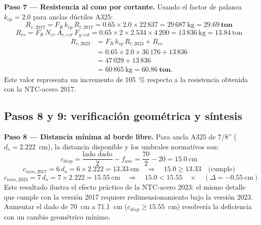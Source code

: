 \textbf{Paso 7 — Resistencia al cono por cortante.}
Usando el factor de palanca $k_{cp}=2.0$ para anclas dúctiles A325:
\begin{equation*}
  R_{v,2017} = F_R\,k_{cp}\,R_{t,2017} = 0.65\times2.0\times22\,837
             = 29\,687~\text{kg} = \mathbf{29.69~\text{ton}}
\end{equation*}
\begin{equation*}
  R_{ev} = F_R\,N_{ev}\,A_{e,est}\,F_{y,est}
         = 0.65\times2\times2.534\times4\,200
         = 13\,836~\text{kg} = 13.84~\text{ton}
\end{equation*}
\begin{align*}
  R_{v,2023}
    &= F_R\,k_{cp}\,R_{t,2023} + R_{ev}\\
    &= 0.65\times2.0\times36\,176 + 13\,836\\
    &= 47\,029 + 13\,836\\
    &= 60\,865~\text{kg}
     = \mathbf{60.86~\text{ton}}.
\end{align*}
Este valor representa un incremento de 105~\% respecto a la resistencia obtenida con la
NTC-acero 2017.

\subsection{Pasos 8 y 9: verificación geométrica y síntesis}

\textbf{Paso 8 — Distancia mínima al borde libre.}
Para ancla A325 de 7/8'' ($d_o = 2.222$~cm), la distancia disponible y los umbrales normativos
son:
\begin{equation*}
  c_{disp} = \frac{\text{lado dado}}{2} - f_{anc}
           = \frac{70}{2} - 20 = 15.0~\text{cm}
\end{equation*}
\begin{equation*}
  c_{min,2017} = 6\,d_o = 6\times2.222 = 13.33~\text{cm} \quad\Rightarrow\quad
  15.0 \geq 13.33 \quad \text{(cumple)}
\end{equation*}
\begin{equation*}
  c_{min,2023} = 7\,d_o = 7\times2.222 = 15.55~\text{cm} \quad\Rightarrow\quad
  15.0 < 15.55 \quad \times\quad (\Delta = {-0.55}~\text{cm})
\end{equation*}
Este resultado ilustra el efecto práctico de la NTC-acero 2023: el mismo detalle que cumple
con la versión 2017 requiere redimensionamiento bajo la versión 2023. Aumentar el dado de
70~cm a 71.1~cm ($c_{disp} \geq 15.55$~cm) resolvería la deficiencia con un cambio
geométrico mínimo.


